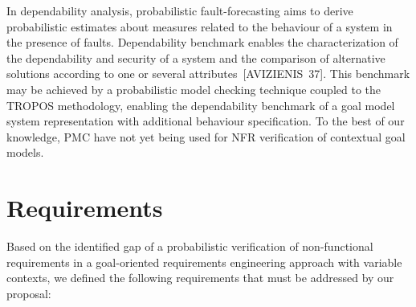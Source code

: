 In dependability analysis, probabilistic fault-forecasting aims to derive probabilistic estimates about measures related to the behaviour of a system in the presence of faults. Dependability benchmark enables the characterization of the dependability and security of a system and the comparison of alternative solutions according to one or several attributes~[AVIZIENIS~37]. This benchmark may be achieved by a probabilistic model checking technique coupled to the TROPOS methodology, enabling the dependability benchmark of a goal model system representation with additional behaviour specification. To the best of our knowledge, PMC have not yet being used for NFR verification of contextual goal models.


\section{Requirements}

Based on the identified gap of a probabilistic verification of non-functional requirements in a goal-oriented requirements engineering approach with variable contexts, we defined the following requirements that must be addressed by our proposal:

